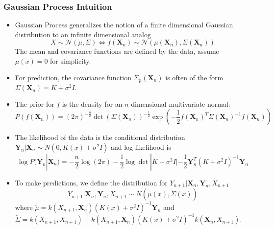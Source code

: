 \documentclass{beamer}
\begin{document}
\begin{frame}
\frametitle{Gaussian Process Intuition}
\begin{itemize}
\item Gaussian Process generalizes the notion of a finite dimensional Gaussian distribution to an infinite dimensional analog
$$X \sim \mathcal{N}(\mu, \Sigma) \Longleftrightarrow f(\textbf{X}_n) \sim \mathcal{N}(\mu(\textbf{X}_n), \Sigma(\textbf{X}_n))$$
The mean and covariance functions are defined by the data, assume $\mu(x)=0$ for simplicity.
\item For prediction, the covariance function $\Sigma_p(\textbf{X}_n)$ is often of the form $\Sigma(\textbf{X}_n) = K+\sigma^2I$.
\end{itemize}
\end{frame}

\begin{frame}
\begin{itemize}
\item The prior for $f$ is the density for an $n$-dimensional multivariate normal:
$$P(f(\textbf{X}_n)) = (2\pi)^{-\frac{n}{2}} \det( \Sigma(\textbf{X}_n))^{-\frac{1}{2}} \exp \left(-\frac{1}{2} f(\textbf{X}_n)^T\Sigma(\textbf{X}_n)^{-1} f(\textbf{X}_n) \right)$$
\item The likelihood of the data is the conditional distribution $\textbf{Y}_n |\textbf{X}_n \sim N(0, K(x) + \sigma^2 I)$ and log-likelihood is 
$$\log P(\textbf{Y}_n|\textbf{X}_n) = -\frac{n}{2} \log (2\pi) - \frac{1}{2} \log \det |K+\sigma^2I| -\frac{1}{2} \textbf{Y}_n^T (K+\sigma^2 I)^{-1} \textbf{Y}_n$$
\item To make predictions, we define the distribution for $Y_{n+1} | \textbf{X}_n, \textbf{Y}_n, X_{n+1}$
$$Y_{n+1} | \textbf{X}_n, \textbf{Y}_n, X_{n+1} \sim N(\tilde{\mu}(x), \tilde{\Sigma}(x))$$
where $\tilde{\mu} = k(X_{n+1},\textbf{X}_n)(K(x) + \sigma^2 I)^{-1} \textbf{Y}_n$ and $\tilde{\Sigma} = k(X_{n+1},X_{n+1}) - k(X_{n+1},\textbf{X}_n)(K(x) + \sigma^2 I)^{-1}k(\textbf{X}_n,X_{n+1})$.

\end{itemize}
\end{frame}
\end{document}

